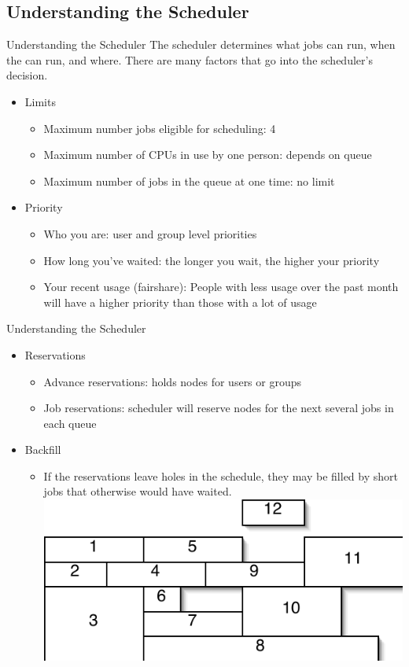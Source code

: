 \documentclass{beamer}
\begin{document}
\subsection{Understanding the Scheduler}
\begin{frame}{Understanding the Scheduler}
The scheduler determines what jobs can run, when the can run, and where.  There
are many factors that go into the scheduler's decision.
  \begin{itemize}
  \item<1-> Limits
    \begin{itemize}
    \item<1-> Maximum number jobs eligible for scheduling: 4
    \item<1-> Maximum number of CPUs in use by one person: depends on queue
    \item<1-> Maximum number of jobs in the queue at one time: no limit
    \end{itemize}
  \item<2-> Priority
    \begin{itemize}
    \item<2-> Who you are: user and group level priorities
    \item<2-> How long you've waited: the longer you wait, the higher your
priority
    \item<2-> Your recent usage (fairshare): People with less usage over the
past month will have a higher priority than those with a lot of usage
    \end{itemize}
  \end{itemize}
\end{frame}
\begin{frame}{Understanding the Scheduler}
  \begin{itemize}
  \item<1-> Reservations
    \begin{itemize}
    \item<1-> Advance reservations: holds nodes for users or groups
    \item<1-> Job reservations: scheduler will reserve nodes for the next
several jobs in each queue
    \end{itemize}
  \item<2-> Backfill
    \begin{itemize}
    \item<2-> If the reservations leave holes in the schedule, they may be
filled by short jobs that otherwise would have waited.\\
	\includegraphics{job-grid}
    \end{itemize}
  \end{itemize}
\end{frame}
\end{document}
